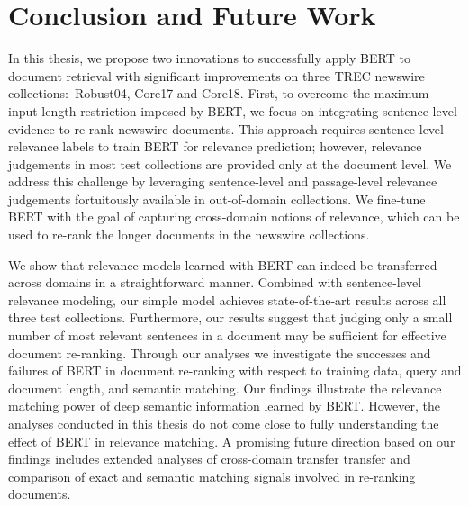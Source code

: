 \chapter{Conclusion and Future Work}
\label{ch:conclusion}

In this thesis, we propose two innovations to successfully apply BERT to document retrieval with significant improvements on three TREC newswire collections:\ Robust04, Core17 and Core18.
First, to overcome the maximum input length restriction imposed by BERT, we focus on integrating sentence-level evidence to re-rank newswire documents.
This approach requires sentence-level relevance labels to train BERT for relevance prediction; however, relevance judgements in most test collections are provided only at the document level.
We address this challenge by leveraging sentence-level and passage-level relevance judgements fortuitously available in out-of-domain collections.
We fine-tune BERT with the goal of capturing cross-domain notions of relevance, which can be used to re-rank the longer documents in the newswire collections.

We show that relevance models learned with BERT can indeed be transferred across domains in a straightforward manner.
Combined with sentence-level relevance modeling, our simple model achieves state-of-the-art results across all three test collections.
Furthermore, our results suggest that judging only a small number of most relevant sentences in a document may be sufficient for effective document re-ranking.
Through our analyses we investigate the successes and failures of BERT in document re-ranking with respect to training data, query and document length, and semantic matching.
Our findings illustrate the relevance matching power of deep semantic information learned by BERT.
However, the analyses conducted in this thesis do not come close to fully understanding the effect of BERT in relevance matching.
A promising future direction based on our findings includes extended analyses of cross-domain transfer transfer and comparison of exact and semantic matching signals involved in re-ranking documents.